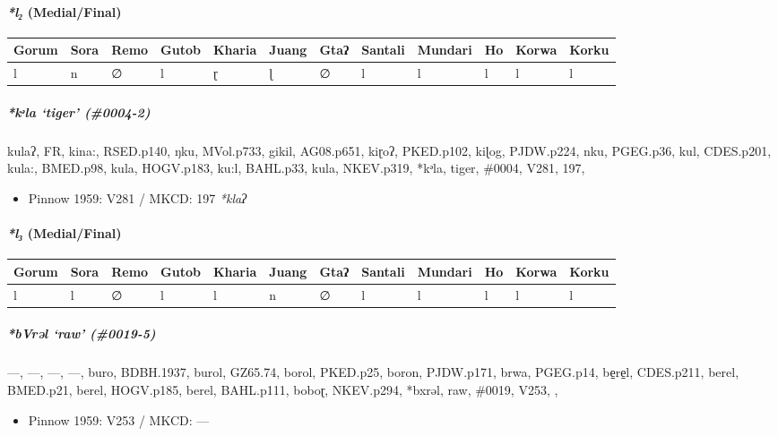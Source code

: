 \documentclass[a4paper,]{article}
\providecommand{\tightlist}{%
  \setlength{\itemsep}{0pt}\setlength{\parskip}{0pt}}
\let\oldparagraph\paragraph
\renewcommand{\paragraph}[1]{\oldparagraph{#1}\mbox{}}
\let\oldsubparagraph\subparagraph
\renewcommand{\subparagraph}[1]{\oldsubparagraph{#1}\mbox{}}
\begin{document}
\paragraph{\texorpdfstring{\emph{*l₂}
(Medial/Final)}{*l₂ (Medial/Final)}}\label{l-medialfinal}

\begin{longtable}[]{@{}llllllllllll@{}}
\toprule
Gorum & Sora & Remo & Gutob & Kharia & Juang & Gtaʔ & Santali & Mundari
& Ho & Korwa & Korku\tabularnewline
\midrule
\endhead
l & n & ∅ & l & ɽ & ɭ & ∅ & l & l & l & l & l\tabularnewline
\bottomrule
\end{longtable}

\subparagraph{\texorpdfstring{\emph{*kᵊla} `tiger'
(\#0004-2)}{*kᵊla tiger (\#0004-2)}}\label{kux1d4ala-tiger-0004-2}

kulaʔ, FR, kina:, RSED.p140, ŋku, MVol.p733, gikil, AG08.p651, kiɽoʔ,
PKED.p102, kiɭog, PJDW.p224, nku, PGEG.p36, kul, CDES.p201, kula:,
BMED.p98, kula, HOGV.p183, ku:l, BAHL.p33, kula, NKEV.p319, *kᵊla,
tiger, \#0004, V281, 197,

\begin{itemize}
\tightlist
\item
  Pinnow 1959: V281 / MKCD: 197 \emph{*klaʔ}
\end{itemize}

\paragraph{\texorpdfstring{\emph{*l₃}
(Medial/Final)}{*l₃ (Medial/Final)}}\label{l-medialfinal-1}

\begin{longtable}[]{@{}llllllllllll@{}}
\toprule
Gorum & Sora & Remo & Gutob & Kharia & Juang & Gtaʔ & Santali & Mundari
& Ho & Korwa & Korku\tabularnewline
\midrule
\endhead
l & l & ∅ & l & l & n & ∅ & l & l & l & l & l\tabularnewline
\bottomrule
\end{longtable}

\subparagraph{\texorpdfstring{\emph{*bVrəl} `raw'
(\#0019-5)}{*bVrəl raw (\#0019-5)}}\label{bvrux259l-raw-0019-5}

---, ---, ---, ---, buro, BDBH.1937, burol, GZ65.74, borol, PKED.p25,
boron, PJDW.p171, brwa, PGEG.p14, be̠re̠l, CDES.p211, berel, BMED.p21,
berel, HOGV.p185, berel, BAHL.p111, boboɽ, NKEV.p294, *bxrəl, raw,
\#0019, V253, ,

\begin{itemize}
\tightlist
\item
  Pinnow 1959: V253 / MKCD: ---
\end{itemize}
\end{document}
